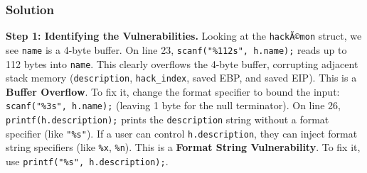 \documentclass{article}
\begin{document}
\subsubsection*{Solution}
\textbf{Step 1: Identifying the Vulnerabilities.}
Looking at the \texttt{hackÃ©mon} struct, we see \texttt{name} is a 4-byte buffer.
On line 23, \texttt{scanf("\%112s", h.name);} reads up to 112 bytes into \texttt{name}. This clearly overflows the 4-byte buffer, corrupting adjacent stack memory (\texttt{description}, \texttt{hack\_index}, saved EBP, and saved EIP). This is a \textbf{Buffer Overflow}. To fix it, change the format specifier to bound the input: \texttt{scanf("\%3s", h.name);} (leaving 1 byte for the null terminator).
On line 26, \texttt{printf(h.description);} prints the \texttt{description} string without a format specifier (like \texttt{"\%s"}). If a user can control \texttt{h.description}, they can inject format string specifiers (like \texttt{\%x}, \texttt{\%n}). This is a \textbf{Format String Vulnerability}. To fix it, use \texttt{printf("\%s", h.description);}.
\end{document}
